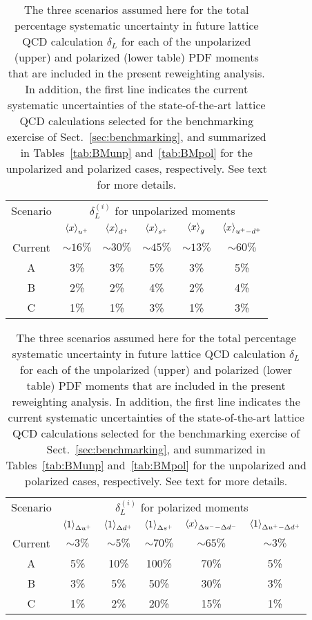 \begin{table}[t]
  \centering
  \renewcommand{\arraystretch}{1.3} 
  \begin{tabular}{c||ccccc}
    \hline
    Scenario &  \multicolumn{5}{c}{$\delta_L^{(i)}$ for unpolarized moments}   \\
&    $\left\langle x\right\rangle_{u^+}$  &   $\left\langle x\right\rangle_{d^+}$   &  $\left\langle x\right\rangle_{s^+}$  &
$\left\langle x\right\rangle_{g}$  &   $\left\langle x\right\rangle_{u^+-d^+}$  \\
    \hline
    Current  & $\sim 16\%$  &  $\sim 30\%$
    & $\sim 45\%$  & $\sim 13\%$  &  $\sim 60\%$ \\
    A   & 3\%  & 3\% &  5\% &  3\% &  5\% \\
 B   & 2\%  & 2\% &  4\% &  2\% &  4\%  \\
  C   & 1\%  & 1\% &  3\% &  1\% &  3\%  \\
    \hline
  \end{tabular}\vspace{0.7cm}
   \begin{tabular}{c||ccccc}
    \hline
    Scenario   &
    \multicolumn{5}{c}{$\delta_L^{(i)}$ for polarized moments} \\ 
& $\left\langle 1\right\rangle_{\Delta u^+}$  & $\left\langle 1\right\rangle_{\Delta d^+}$  & $\left\langle 1\right\rangle_{\Delta s^+}$
&  $\left\langle x\right\rangle_{\Delta u^--\Delta d^-}$  &  $\left\langle 1\right\rangle_{\Delta u^+ - \Delta d^+}$\\
    \hline
    Current  &
    $\sim 3\%$  & $\sim 5\%$ & $\sim 70\%$ & $\sim 65\%$ & $\sim 3\%$ \\
    \hline
    A   & 
    5\% &    10\%  &   100\% &    70\%  &    5\% \\
 B   &
 3\% &    5\%  &   50\% &    30\%  &    3\% \\
  C   & 1\% &    2\%  &   20\% &    15\%  &    1\% \\
    \hline
  \end{tabular}
   \caption{\small The three scenarios assumed here
     for the total percentage
     systematic uncertainty
    in future lattice QCD calculation $\delta_L$ for each
    of the unpolarized (upper) and polarized (lower table) PDF
    moments that are included
    in the present reweighting analysis.
    In addition, the first line indicates the current systematic
    uncertainties of the state-of-the-art lattice QCD calculations
    selected for the benchmarking exercise of Sect.~\ref{sec:benchmarking},
    and summarized in Tables~\ref{tab:BMunp} and~\ref{tab:BMpol}
    for the unpolarized and polarized cases, respectively.
    See text for more details.
\label{tab:scenarios}
  }
\end{table}


